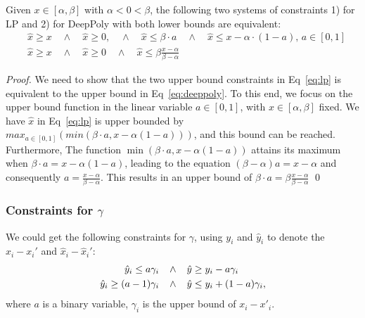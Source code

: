 \begin{proposition}
	\label{LP}
	Given $x \in [\alpha,\beta]$ with $\alpha < 0 < \beta$, the following two systems of constraints 
	1) for LP and 2) for DeepPoly with both lower bounds are equivalent:
	\begin{align}
& \hat{x} \geq x \quad \wedge \quad \hat{x} \geq 0, \quad \wedge \quad \hat{x} \leq \beta \cdot a \quad \wedge \quad \hat{x} \leq x-\alpha \cdot (1-a), \, a \in [0,1]  \label{eq:lp}\\
&\hat{x} \geq x \quad \wedge \quad \hat{x} \geq 0 \quad \wedge \quad \hat{x} \leq \beta \frac{x-\alpha}{\beta-\alpha} \label{eq:deeppoly}
	\end{align} 
\end{proposition}

\begin{proof}
We need to show that the two upper bound constraints in Eq~\ref{eq:lp} is equivalent to the upper bound in Eq~\ref{eq:deeppoly}. To this end, we focus on the upper bound function in the linear variable $a \in  [0,1]$, with $x \in [\alpha,\beta]$ fixed. We have $\hat{x}$ in Eq~\ref{eq:lp} is upper bounded by $max_{a \in [0,1]} (min(\beta \cdot a, x - \alpha (1-a)))$, and this bound can be reached. Furthermore, 
	The function $\min(\beta \cdot a, x - \alpha (1-a))$ attains its maximum when $\beta \cdot a = x - \alpha (1-a)$, leading to the equation $(\beta - \alpha) a = x - \alpha$ and consequently $a = \frac{x - \alpha}{\beta-\alpha}$. This results in an upper bound of $\beta \cdot a = \beta \frac{x - \alpha}{\beta-\alpha}$ \qed
\end{proof}

\subsubsection*{Constraints for $\gamma$}

We could get the following constraints for $\gamma$, using $y_i$ and $\hat{y}_i$ to denote the $x_i-x_i'$ and $\hat{x}_i-\hat{x}_i'$:\begin{align*}
	\hat{y}_i \leq a \gamma_i \hspace*{2ex} &\wedge \hspace*{2ex}\hat{y} \geq y_i - a \gamma_i\\
	\hat{y}_i \geq (a-1) \gamma_i  \hspace*{2ex} &\wedge \hspace*{2ex} \hat{y} \leq y_i + (1-a) \gamma_i,
\end{align*} where $a$ is a binary variable, $\gamma_i$ is the upper bound of $x_i-x'_i$.


